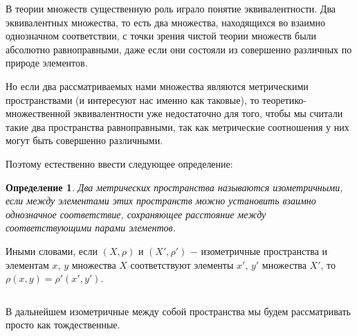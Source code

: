 \documentclass{article}
\newtheorem{definition}{Определение}[section]
\begin{document}
В теории множеств существенную роль играло понятие эквивалентности. Два эквивалентных множества, то есть два множества, находящихся во взаимно однозначном соответствии, с точки зрения чистой теории множеств были абсолютно равноправными, даже если они состояли из совершенно различных по природе элементов.

Но если два рассматриваемых нами множества являются метрическими пространствами (и интересуют нас именно как таковые), то теоретико-множественной эквивалентности уже недостаточно для того, чтобы мы считали такие два пространства равноправными, так как метрические соотношения у них могут быть совершенно различными.

Поэтому естественно ввести следующее определение:

\begin{definition}
Два метрических пространства называются изометричными, если между элементами этих пространств можно установить взаимно однозначное соответствие, сохраняющее расстояние между соответствующими парами элементов.
\end{definition}

Иными словами, если \((X, \rho)\) и \((X', \rho')\) \(-\) изометричные пространства и элементам \(x\), \(y\) множества \(X\) соответствуют элементы \(x'\), \(y'\) множества \(X'\), то \(\rho(x, y) = \rho'(x', y')\).

\(\)

В дальнейшем изометричные между собой пространства мы будем рассматривать просто как тождественные.
\end{document}

